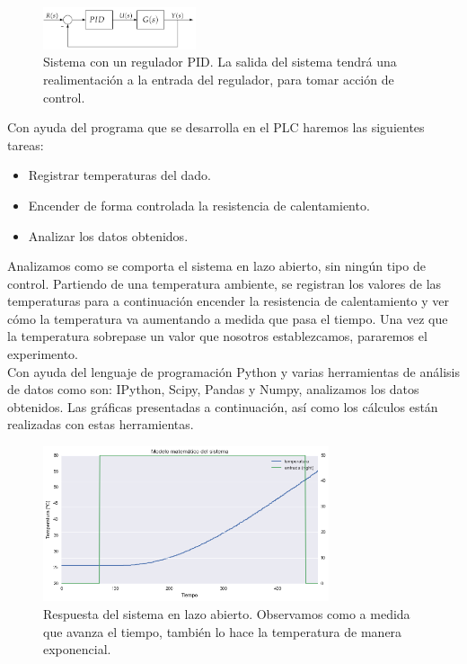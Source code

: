 \begin{figure}[H]
    \centering
    \includegraphics[width=0.4\textwidth]{images/PLC/sistema.png}
    \caption[Sistema con un regulador PID.]{Sistema con un regulador PID. La salida del sistema tendrá una realimentación a la entrada del regulador, para tomar acción de control.}
    \label{fig:plc_sistema}
\end{figure}

Con ayuda del programa que se desarrolla en el PLC haremos las siguientes tareas:

\begin{itemize}
    \item{Registrar temperaturas del dado.}
    \item{Encender de forma controlada la resistencia de calentamiento.}
    \item{Analizar los datos obtenidos.}
\end{itemize}

Analizamos como se comporta el sistema en lazo abierto, sin ningún tipo de control. Partiendo de una temperatura ambiente, se registran los valores de las temperaturas para a continuación encender la resistencia de calentamiento y ver cómo la temperatura va aumentando a medida que pasa el tiempo. Una vez que la temperatura sobrepase un valor que nosotros establezcamos, pararemos el experimento.\\

Con ayuda del lenguaje de programación Python y varias herramientas de análisis de datos como son: IPython, Scipy, Pandas y Numpy, analizamos los datos obtenidos. Las gráficas presentadas a continuación, así como los cálculos están realizadas con estas herramientas.

\begin{figure}[H]
    \centering
    \includegraphics[width=0.75\textwidth]{images/PLC/modelado/modelado_9_1.png}
    \caption[Respuesta del sistema en lazo abierto]{Respuesta del sistema en lazo abierto. Observamos como a medida que avanza el tiempo, también lo hace la temperatura de manera exponencial.}
    \label{fig:plc_lazo_abierto}
\end{figure}

